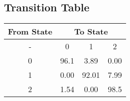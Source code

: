 \documentclass{article}
\begin{document}
\subsection{Transition Table}
\begin{tabular}{|c|c c c|}
    \hline
    \textbf{From State} & \multicolumn{3}{c|}{\textbf{To State}} \\
    \hline
    - & 0 & 1 & 2 \\
    \hline
    0 & 96.1 & 3.89 & 0.00 \\
    1 & 0.00 & 92.01 & 7.99 \\
    2 & 1.54 & 0.00 & 98.5 \\
    \hline
\end{tabular}
\end{document}
